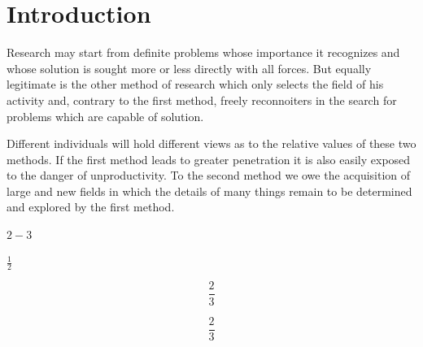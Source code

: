 
\def\baselinestretch{1}
\chapter{Introduction}
\def\baselinestretch{1.66}




Research may start from definite problems whose importance it
recognizes and whose solution is sought more or less directly with all
forces. But equally legitimate is the other method of research which
only selects the field of his activity and, contrary to the first
method, freely reconnoiters in the search for problems which are
capable of solution. 


\cite{mckay:1981:pgi}

\cite{rosenetal:1999:hodacm}

\cite{bangjensenandgutin:2000:dtaaa}

Different individuals will hold different views as
to the relative values of these two methods. If the first method leads
to greater penetration it is also easily exposed to the danger of
unproductivity. To the second method we owe the acquisition of large
and new fields in which the details of many things remain to be
determined and explored by the first method.

$2-3$

$\frac{1}{2}$ 


\begin{equation}
\frac{2}{3}
\end{equation}


\begin{equation*}
\frac{2}{3}
\end{equation*}






